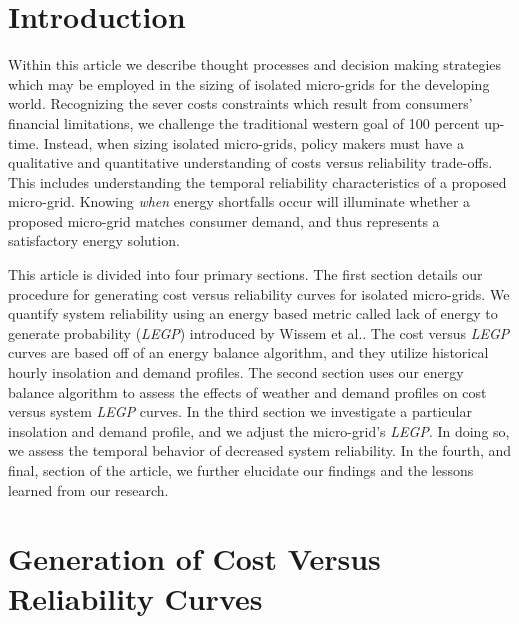 \documentclass{article}
\begin{document}
\begin{abstract}

\end{abstract}

\section{Introduction}

Within this article we describe thought processes and decision making strategies which may be employed in the sizing of isolated micro-grids for the developing world.
Recognizing the sever costs constraints which result from consumers' financial limitations, we challenge the traditional western goal of 100 percent up-time.
Instead, when sizing isolated micro-grids, policy makers must have a qualitative and quantitative understanding of costs versus reliability trade-offs.
This includes understanding the temporal reliability characteristics of a proposed micro-grid.
Knowing \emph{when} energy shortfalls occur will illuminate whether a proposed micro-grid matches consumer demand, and thus represents a satisfactory energy solution.

This article is divided into four primary sections.
The first section details our procedure for generating cost versus reliability curves for isolated micro-grids.
We quantify system reliability using an energy based metric called lack of energy to generate probability (\emph{LEGP}) introduced by Wissem et al.\cite{}.
The cost versus \emph{LEGP} curves are based off of an energy balance algorithm, and they utilize historical hourly insolation and demand profiles.
The second section uses our energy balance algorithm to assess the effects of weather and demand profiles on cost versus system \emph{LEGP} curves.
In the third section we investigate a particular insolation and demand profile, and we adjust the micro-grid's \emph{LEGP}.
In doing so, we assess the temporal behavior of decreased system reliability.
In the fourth, and final, section of the article, we further elucidate our findings and the lessons learned from our research.

\section{Generation of Cost Versus Reliability Curves}
\end{document}

